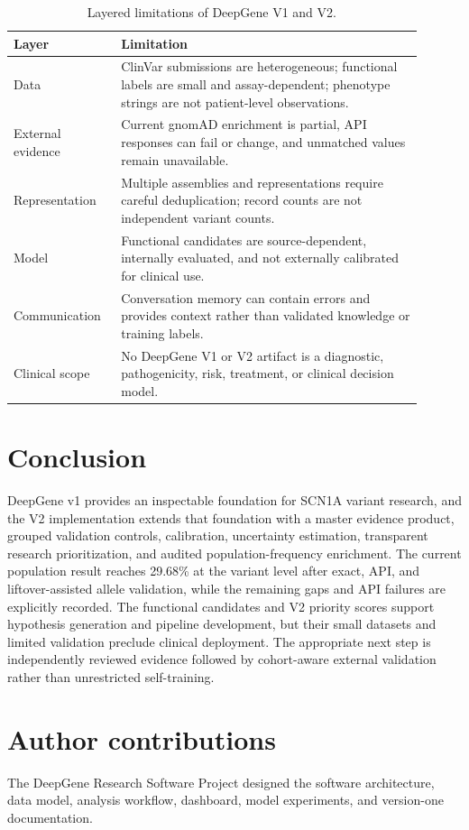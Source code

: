 \documentclass[12pt,a4paper]{article}
\begin{document}
\begin{table}[H]
\centering
\small
\caption{Layered limitations of DeepGene V1 and V2.}
\label{tab:v2limits}
\begin{tabular}{p{0.22\linewidth}p{0.68\linewidth}}
\toprule
Layer & Limitation\\
\midrule
Data & ClinVar submissions are heterogeneous; functional labels are small and assay-dependent; phenotype strings are not patient-level observations.\\
External evidence & Current gnomAD enrichment is partial, API responses can fail or change, and unmatched values remain unavailable.\\
Representation & Multiple assemblies and representations require careful deduplication; record counts are not independent variant counts.\\
Model & Functional candidates are source-dependent, internally evaluated, and not externally calibrated for clinical use.\\
Communication & Conversation memory can contain errors and provides context rather than validated knowledge or training labels.\\
Clinical scope & No DeepGene V1 or V2 artifact is a diagnostic, pathogenicity, risk, treatment, or clinical decision model.\\
\bottomrule
\end{tabular}
\end{table}

\section{Conclusion}
DeepGene v1 provides an inspectable foundation for SCN1A variant research, and
the V2 implementation extends that foundation with a master evidence product,
grouped validation controls, calibration, uncertainty estimation, transparent
research prioritization, and audited population-frequency enrichment. The
current population result reaches 29.68\% at the variant level after exact,
API, and liftover-assisted allele validation, while the remaining gaps and API
failures are explicitly recorded. The functional candidates and V2 priority
scores support hypothesis generation and pipeline development, but their small
datasets and limited validation preclude clinical deployment. The appropriate
next step is independently reviewed evidence followed by cohort-aware external
validation rather than unrestricted self-training.

\section*{Author contributions}
The DeepGene Research Software Project designed the software architecture, data model, analysis workflow, dashboard, model experiments, and version-one documentation.
\end{document}
